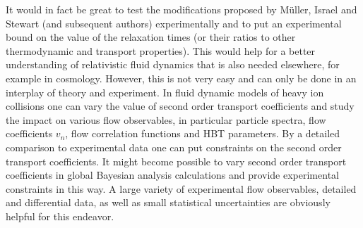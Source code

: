It would in fact be great to test the modifications proposed by Müller,  Israel and Stewart (and subsequent authors) experimentally and to put an experimental bound on the value of the relaxation times (or their ratios to other thermodynamic and transport properties). This would help for a better understanding of relativistic fluid dynamics that is also needed elsewhere,  for example in cosmology. However,  this is not very easy and can only be done in an interplay of theory and experiment. In fluid dynamic models of heavy ion collisions one can vary the value of second order transport coefficients and study the impact on various flow observables,  in particular particle spectra,  flow coefficients $v_n$,  flow correlation functions and HBT parameters. By a detailed comparison to experimental data one can put constraints on the second order transport coefficients. It might become possible to vary second order transport coefficients in global Bayesian analysis calculations and provide experimental constraints in this way. A large variety of experimental flow observables,  detailed and differential data,  as well as small statistical uncertainties are obviously helpful for this endeavor.


